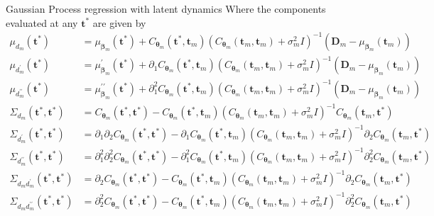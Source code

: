 \documentclass[ignorenonframetext,xcolor=pdflatex,table,dvipsnames,serif]{beamer}
\begin{document}
\begin{frame}{Gaussian Process regression with latent dynamics}
\pause
Where the components evaluated at any $\mathbf{t}^\ast$ are given by
{
\tiny
\begin{align*}
  \mu_{d_m}(\mathbf{t}^\ast) &= \mu_{\bm{\beta}_m}(\mathbf{t}^\ast) + C_{\bm{\theta}_m}(\mathbf{t}^\ast, \mathbf{t}_m)\left(C_{\bm{\theta}_m}(\mathbf{t}_m, \mathbf{t}_m) + \sigma^2_m I\right)^{-1}\left(\mathbf{D}_m - \mu_{\bm{\beta}_m}(\mathbf{t}_m)\right)\\
  \mu_{d_m^\prime}(\mathbf{t}^\ast) &= \mu^\prime_{\bm{\beta}_m}(\mathbf{t}^\ast) + \partial_1 C_{\bm{\theta}_m}(\mathbf{t}^\ast, \mathbf{t}_m)\left(C_{\bm{\theta}_m}(\mathbf{t}_m, \mathbf{t}_m) + \sigma^2_m I\right)^{-1}\left(\mathbf{D}_m - \mu_{\bm{\beta}_m}(\mathbf{t}_m)\right) \\
  \mu_{d_m^{\prime\prime}}(\mathbf{t}^\ast) &= \mu^{\prime\prime}_{\bm{\beta}_m}(\mathbf{t}^\ast) + \partial_1^2 C_{\bm{\theta}_m}(\mathbf{t}^\ast, \mathbf{t}_m)\left(C_{\bm{\theta}_m}(\mathbf{t}_m, \mathbf{t}_m) + \sigma^2_m I\right)^{-1}\left(\mathbf{D}_m - \mu_{\bm{\beta}_m}(\mathbf{t}_m)\right)\\
  \Sigma_{d_m}(\mathbf{t}^\ast, \mathbf{t}^\ast) &= C_{\bm{\theta}_m}(\mathbf{t}^\ast, \mathbf{t}^\ast) - C_{\bm{\theta}_m}(\mathbf{t}^\ast, \mathbf{t}_m)\left(C_{\bm{\theta}_m}(\mathbf{t}_m, \mathbf{t}_m) + \sigma^2_m I\right)^{-1} C_{\bm{\theta}_m}(\mathbf{t}_m, \mathbf{t}^\ast)\\
  \Sigma_{d_m^\prime}(\mathbf{t}^\ast, \mathbf{t}^\ast) &= \partial_1\partial_2C_{\bm{\theta}_m}(\mathbf{t}^\ast, \mathbf{t}^\ast) - \partial_1C_{\bm{\theta}_m}(\mathbf{t}^\ast, \mathbf{t}_m)\left(C_{\bm{\theta}_m}(\mathbf{t}_m, \mathbf{t}_m) + \sigma^2_m I\right)^{-1} \partial_2C_{\bm{\theta}_m}(\mathbf{t}_m, \mathbf{t}^\ast)\\
  \Sigma_{d_m^{\prime\prime}}(\mathbf{t}^\ast, \mathbf{t}^\ast) &= \partial_1^2\partial_2^2 C_{\bm{\theta}_m}(\mathbf{t}^\ast, \mathbf{t}^\ast) - \partial_1^2 C_{\bm{\theta}_m}(\mathbf{t}^\ast, \mathbf{t}_m)\left(C_{\bm{\theta}_m}(\mathbf{t}_m, \mathbf{t}_m) + \sigma^2_m I\right)^{-1} \partial_2^2 C_{\bm{\theta}_m}(\mathbf{t}_m, \mathbf{t}^\ast)\\
  \Sigma_{d_m d_m^\prime}(\mathbf{t}^\ast, \mathbf{t}^\ast) &= \partial_2 C_{\bm{\theta}_m}(\mathbf{t}^\ast, \mathbf{t}^\ast) - C_{\bm{\theta}_m}(\mathbf{t}^\ast, \mathbf{t}_m)\left(C_{\bm{\theta}_m}(\mathbf{t}_m, \mathbf{t}_m) + \sigma^2_m I\right)^{-1} \partial_2 C_{\bm{\theta}_m}(\mathbf{t}_m, \mathbf{t}^\ast)\\
  \Sigma_{d_m d_m^{\prime\prime}}(\mathbf{t}^\ast, \mathbf{t}^\ast) &= \partial_2^2 C_{\bm{\theta}_m}(\mathbf{t}^\ast, \mathbf{t}^\ast) - C_{\bm{\theta}_m}(\mathbf{t}^\ast, \mathbf{t}_m)\left(C_{\bm{\theta}_m}(\mathbf{t}_m, \mathbf{t}_m) + \sigma^2_m I\right)^{-1} \partial_2^2 C_{\bm{\theta}_m}(\mathbf{t}_m, \mathbf{t}^\ast)\\

\end{align*}}
\end{frame}
\end{document}
